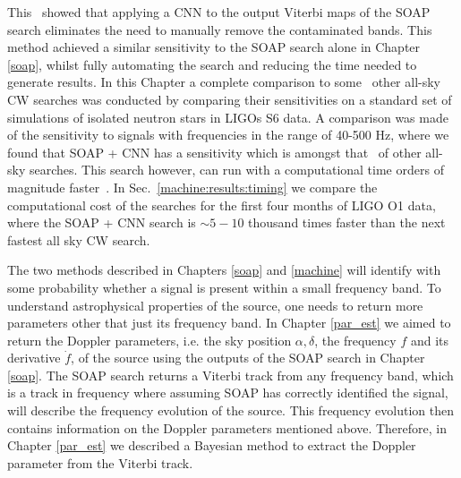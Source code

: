 This~ showed that applying a \gls{CNN} to the output
Viterbi maps of the SOAP search eliminates the need to manually remove the
contaminated bands.  This method achieved a similar sensitivity to the SOAP
search alone in Chapter \ref{soap}, whilst fully automating the search and
reducing the time needed to generate results.  In this Chapter a complete
comparison to some~ other all-sky \gls{CW}
searches was conducted by comparing their sensitivities on a standard set of
simulations of isolated neutron stars in \glspl{LIGO} S6 data.  A comparison
was made of the sensitivity to signals with frequencies in the range of 40-500
Hz, where we found that SOAP + \gls{CNN} has a sensitivity which is amongst
that~ of other all-sky searches.
This search however, can run with a computational time orders of magnitude
faster~. In Sec.~\ref{machine:results:timing} we
compare the computational cost of the searches for the first four months of
\gls{LIGO} O1 data, where the SOAP + \gls{CNN} search is $\sim 5 - 10$ thousand
times faster than the next fastest all sky \gls{CW} search.

\bigskip

The two methods described in Chapters \ref{soap} and \ref{machine} will
identify with some probability whether a signal is present within a small
frequency band.  To understand astrophysical properties of the source, one
needs to return more parameters other that just its frequency band.  In Chapter
\ref{par_est} we aimed to return the Doppler parameters, i.e. the sky position
$\alpha, \delta$, the frequency $f$ and its derivative $\dot{f}$, of the source
using the outputs of the SOAP search in Chapter \ref{soap}.  The SOAP search
returns a Viterbi track from any frequency band, which is a track in frequency
where assuming SOAP has correctly identified the signal, will describe the
frequency evolution of the source.  This frequency evolution then contains
information on the Doppler parameters mentioned above.  Therefore, in Chapter
\ref{par_est} we described a Bayesian method to extract the Doppler parameter
from the Viterbi track.

